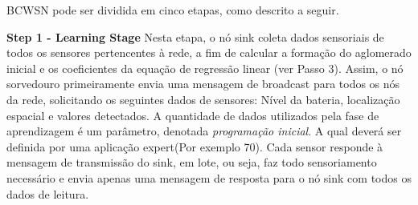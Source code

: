 \documentclass{acm_proc_article-sp}
\begin{document}
BCWSN pode ser dividida em cinco etapas, como descrito a seguir. 
\vspace*{-.3cm}

{\bf Step 1 - Learning Stage}
Nesta etapa, o nó sink coleta dados sensoriais de todos os sensores
{pertencentes à rede}, a fim de calcular a formação do aglomerado inicial e os
coeficientes da equação de regressão linear (ver Passo 3). Assim, o nó sorvedouro primeiramente envia uma mensagem de
broadcast para todos os nós da rede, solicitando os seguintes dados de sensores: Nível da bateria,
localização espacial e valores detectados. A quantidade de dados utilizados pela fase de
aprendizagem é um parâmetro, denotada \textit{programação inicial}. A qual
deverá ser definida por uma aplicação expert(Por exemplo 70). Cada sensor responde à mensagem de transmissão
do sink, em lote, ou seja, faz todo sensoriamento necessário e envia apenas uma mensagem de resposta para o
nó sink com todos os dados de leitura.
\vspace*{-.3cm}
\end{document}
